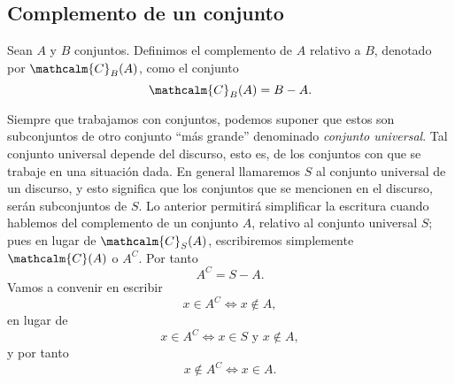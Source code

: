 \subsection{Complemento de un conjunto}

\begin{definicion}{}{}
    Sean $A$ y $B$ conjuntos. Definimos el complemento de $A$ relativo a $B$, denotado por $\mathcalm{C}_B(A)$, como el conjunto
    $$\mathcalm{C}_B(A) = B - A.$$
\end{definicion}

Siempre que trabajamos con conjuntos, podemos suponer que estos son subconjuntos de otro conjunto ``más grande'' denominado \emph{conjunto universal}. Tal conjunto universal depende del discurso, esto es, de los conjuntos con que se trabaje en una situación dada. En general llamaremos $S$ al conjunto universal de un discurso, y esto significa que los conjuntos que se mencionen en el discurso, serán subconjuntos de $S$. Lo anterior permitirá simplificar la escritura cuando hablemos del complemento de un conjunto $A$, relativo al conjunto universal $S$; pues en lugar de $\mathcalm{C}_S(A)$, escribiremos simplemente $\mathcalm{C}(A)$ o $A^C$. Por tanto
$$A^C = S - A.$$
Vamos a convenir en escribir
$$x \in A^C \Longleftrightarrow x \notin A,$$
en lugar de
$$x \in A^C \Longleftrightarrow x \in S \text{ y } x \notin A,$$
y por tanto
$$x \notin A^C \Longleftrightarrow x \in A.$$

